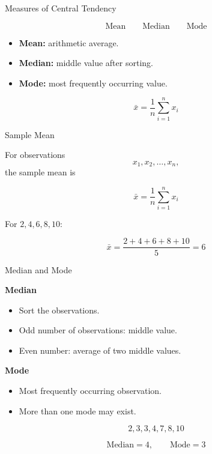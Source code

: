 \documentclass[aspectratio=169,11pt]{beamer}
\begin{document}
\begin{frame}{Measures of Central Tendency}

\begin{center}
\Large
\[
\boxed{\text{Mean}\qquad\text{Median}\qquad\text{Mode}}
\]
\end{center}

\begin{itemize}
    \item \textbf{Mean:} arithmetic average.
    \item \textbf{Median:} middle value after sorting.
    \item \textbf{Mode:} most frequently occurring value.
\end{itemize}

\[
\bar{x}=\frac{1}{n}\sum_{i=1}^{n}x_i
\]

\end{frame}

\begin{frame}{Sample Mean}

For observations
\[
x_1,x_2,\ldots,x_n,
\]
the sample mean is

\[
\boxed{
\bar{x}=\frac{1}{n}\sum_{i=1}^{n}x_i
}
\]

\begin{example}
For $2,4,6,8,10$:

\[
\bar{x}
=
\frac{2+4+6+8+10}{5}
=
6
\]
\end{example}

\end{frame}

\begin{frame}{Median and Mode}

\textbf{Median}

\begin{itemize}
    \item Sort the observations.
    \item Odd number of observations: middle value.
    \item Even number: average of two middle values.
\end{itemize}

\textbf{Mode}

\begin{itemize}
    \item Most frequently occurring observation.
    \item More than one mode may exist.
\end{itemize}

\[
2,3,3,4,7,8,10
\]

\[
\text{Median}=4,\qquad\text{Mode}=3
\]

\end{frame}
\end{document}
